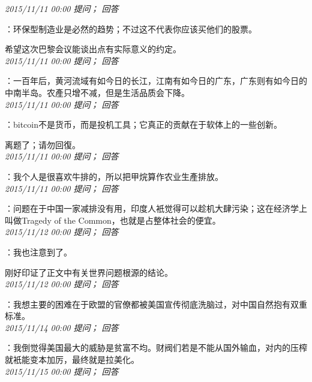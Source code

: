 \documentclass[twocolumn]{ctexart}
\begin{document}
\textit{\hfill\noindent\small 2015/11/11 00:00 提问； 回答}

：环保型制造业是必然的趋势；不过这不代表你应该买他们的股票。

希望这次巴黎会议能谈出点有实际意义的约定。\\

\textit{\hfill\noindent\small 2015/11/11 00:00 提问； 回答}

：一百年后，黄河流域有如今日的长江，江南有如今日的广东，广东则有如今日的中南半岛。农產只增不减，但是生活品质会下降。\\

\textit{\hfill\noindent\small 2015/11/11 00:00 提问； 回答}

：bitcoin不是货币，而是投机工具；它真正的贡献在于软体上的一些创新。

离题了；请勿回復。\\

\textit{\hfill\noindent\small 2015/11/11 00:00 提问； 回答}

：我个人是很喜欢牛排的，所以把甲烷算作农业生產排放。\\

\textit{\hfill\noindent\small 2015/11/11 00:00 提问； 回答}

：问题在于中国一家减排没有用，印度人衹觉得可以趁机大肆污染；这在经济学上叫做Tragedy of the Common，也就是占整体社会的便宜。\\

\textit{\hfill\noindent\small 2015/11/12 00:00 提问； 回答}

：我也注意到了。

刚好印证了正文中有关世界问题根源的结论。\\

\textit{\hfill\noindent\small 2015/11/12 00:00 提问； 回答}

：我想主要的困难在于欧盟的官僚都被美国宣传彻底洗脑过，对中国自然抱有双重标准。\\

\textit{\hfill\noindent\small 2015/11/14 00:00 提问； 回答}

：我倒觉得美国最大的威胁是贫富不均。财阀们若是不能从国外输血，对内的压榨就衹能变本加厉，最终就是拉美化。\\

\textit{\hfill\noindent\small 2015/11/15 00:00 提问； 回答}
\end{document}
